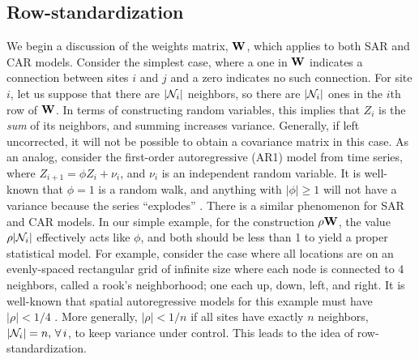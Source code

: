 \documentclass[11pt, titlepage]{article}\usepackage[]{graphicx}\usepackage[]{color}
\begin{document}
\begin{spacing}{1.9}
\begin{flushleft}

\subsection*{Row-standardization}

We begin a discussion of the weights matrix, $\mathbf{W}$, which applies to both SAR and CAR models.  Consider the simplest case, where a one in $\mathbf{W}$ indicates a connection between sites $i$ and $j$ and a zero indicates no such connection.  For site $i$, let us suppose that there are $|\mathcal{N}_i|$ neighbors, so there are $|\mathcal{N}_i|$ ones in the $i$th row of $\mathbf{W}$.  In terms of constructing random variables, this implies that $Z_i$ is the \textit{sum} of its neighbors, and summing increases variance.  Generally, if left uncorrected, it will not be possible to obtain a covariance matrix in this case. As an analog, consider the first-order autoregressive (AR1) model from time series, where $Z_{i+1} = \phi Z_i + \nu_i$, and $\nu_i$ is an independent random variable.  It is well-known that $\phi = 1$ is a random walk, and anything with $|\phi| \geq 1$ will not have a variance because the series ``explodes'' \citep[e.g.,][pg. 53]{Hami:time:1994}.  There is a similar phenomenon for SAR and CAR models. In our simple example, for the construction $\rho\mathbf{W}$, the value  $\rho |\mathcal{N}_i|$ effectively acts like $\phi$, and both should be less than 1 to yield a proper statistical model. For example, consider the case where all locations are on an evenly-spaced rectangular grid of infinite size where each node is connected to 4 neighbors, called a rook's neighborhood; one each up, down, left, and right. It is well-known that spatial autoregressive models for this example must have $|\rho| < 1/4$ \citep[pg. 82]{Hain:spat:1990}. More generally, $|\rho| < 1/n$ if all sites have exactly $n$ neighbors, $|\mathcal{N}_i| = n, \, \forall \, i$, to keep variance under control. This leads to the idea of row-standardization.  


\end{flushleft}
\end{spacing}
\end{document}

